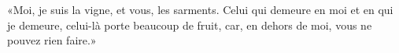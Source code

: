 \encetemps \jesusdisciples
	«Moi, je suis la vigne, et vous, les sarments.
Celui qui demeure en moi et en qui je demeure, celui-là porte beaucoup de fruit,
	car, en dehors de moi, vous ne pouvez rien faire.»
